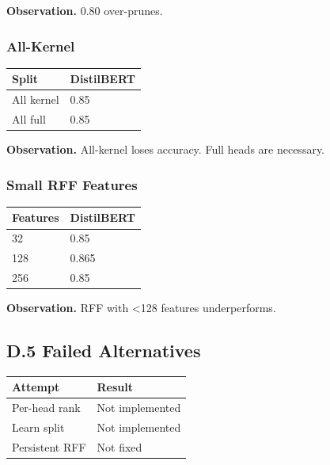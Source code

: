 \textbf{Observation.} 0.80 over-prunes.

\subsubsection{All-Kernel}

\begin{table}[H]
\centering
\small
\begin{tabular}{ll}
\toprule
\textbf{Split} & \textbf{DistilBERT} \\
\midrule
All kernel & 0.85 \\
All full & 0.85 \\
\bottomrule
\end{tabular}
\end{table}

\textbf{Observation.} All-kernel loses accuracy. Full heads are necessary.

\subsubsection{Small RFF Features}

\begin{table}[H]
\centering
\small
\begin{tabular}{ll}
\toprule
\textbf{Features} & \textbf{DistilBERT} \\
\midrule
32 & 0.85 \\
128 & 0.865 \\
256 & 0.85 \\
\bottomrule
\end{tabular}
\end{table}

\textbf{Observation.} RFF with \textless{}128 features underperforms.

\subsection{D.5 Failed Alternatives}

\begin{table}[H]
\centering
\small
\begin{tabular}{ll}
\toprule
\textbf{Attempt} & \textbf{Result} \\
\midrule
Per-head rank & Not implemented \\
Learn split & Not implemented \\
Persistent RFF & Not fixed \\
\bottomrule
\end{tabular}
\end{table}

